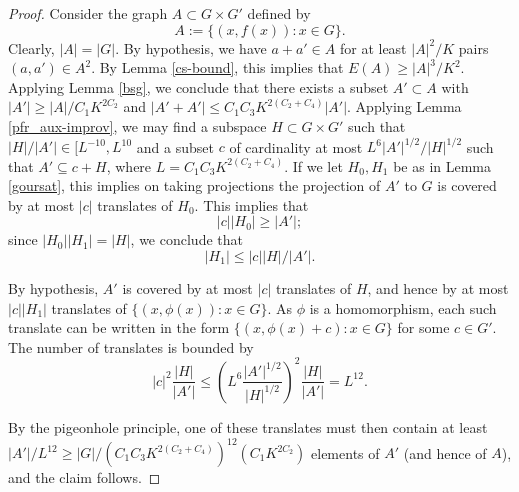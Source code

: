 \begin{proof} Consider the graph $A \subset G \times G'$ defined by
$$ A := \{ (x,f(x)): x \in G \}.$$
Clearly, $|A| = |G|$.  By hypothesis, we have $a+a' \in A$ for at least
$|A|^2/K$ pairs $(a,a') \in A^2$. By Lemma \ref{cs-bound}, this implies that
$E(A) \geq |A|^3/K^2$.  Applying Lemma \ref{bsg}, we conclude that there
exists a subset $A' \subset A$ with $|A'| \geq |A|/C_1 K^{2C_2}$ and $|A'+A'|
\leq C_1C_3 K^{2(C_2+C_4)} |A'|$. Applying Lemma \ref{pfr_aux-improv}, we may
find a subspace $H \subset G \times G'$ such that $|H| / |A'| \in [L^{-10},
L^{10}$ and a subset $c$ of cardinality at most $L^6 |A'|^{1/2} / |H|^{1/2}$
such that $A' \subseteq c + H$, where $L =  C_1C_3 K^{2(C_2+C_4)}$. If we let
$H_0,H_1$ be as in Lemma \ref{goursat}, this implies on taking projections
the projection of $A'$ to $G$ is covered by at most $|c|$ translates of
$H_0$.  This implies that
$$ |c| |H_0| \geq |A'|;$$
since $|H_0| |H_1| = |H|$, we conclude that
$$ |H_1| \leq |c| |H|/|A'|.$$

By hypothesis, $A'$ is covered by at most $|c|$ translates of $H$, and hence
by at most $|c| |H_1|$ translates of $\{ (x,\phi(x)): x \in G \}$.  As $\phi$
is a homomorphism, each such translate can be written in the form $\{
(x,\phi(x)+c): x \in G \}$ for some $c \in G'$. The number of translates is
bounded by
$$
|c|^2 \frac{|H|}{|A'|} \leq \left(L^6 \frac{|A'|^{1/2}}{|H|^{1/2}}\right)^2 \frac{|H|}{|A'|} = L^{12}.
$$

By the pigeonhole principle, one of these translates must then contain at
least $|A'|/L^{12} \geq |G| / (C_1C_3 K^{2(C_2+C_4)})^{12} (C_1 K^{2C_2})$
elements of $A'$ (and hence of $A$), and the claim follows.
\end{proof}
